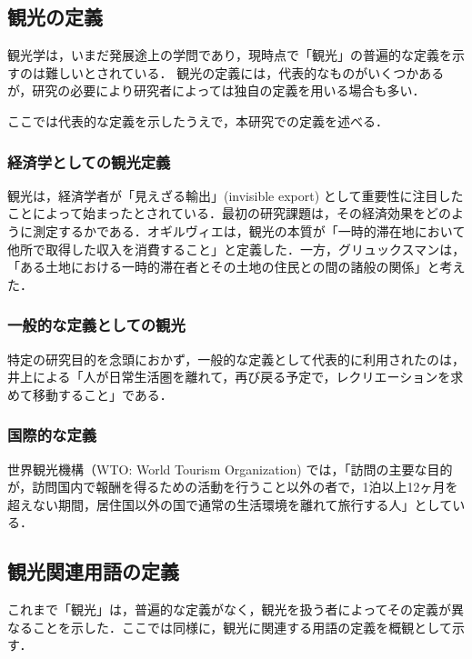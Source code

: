 \documentclass{jsarticle}
\begin{document}
\subsection{観光の定義}

\label{definition_of_tourism}

観光学は，いまだ発展途上の学問であり，現時点で「観光」の普遍的な定義を示すのは難しいとされている\cite{kanko_define}．
観光の定義には，代表的なものがいくつかあるが，研究の必要により研究者によっては独自の定義を用いる場合も多い．

ここでは代表的な定義を示したうえで，本研究での定義を述べる．


\subsubsection{経済学としての観光定義}

観光は，経済学者が「見えざる輸出」(invisible export) として重要性に注目したことによって始まったとされている\cite{kanko_define}．最初の研究課題は，その経済効果をどのように測定するかである．オギルヴィエは，観光の本質が「一時的滞在地において他所で取得した収入を消費すること」と定義した\cite{tourism_economy1}．一方，グリュックスマンは，「ある土地における一時的滞在者とその土地の住民との間の諸般の関係」と考えた\cite{tourism_economy2}．

\subsubsection{一般的な定義としての観光}

特定の研究目的を念頭におかず，一般的な定義として代表的に利用されたのは，井上による「人が日常生活圏を離れて，再び戻る予定で，レクリエーションを求めて移動すること」である\cite{inoue}．

\subsubsection{国際的な定義}

世界観光機構（WTO: World Tourism Organization) では，「訪問の主要な目的が，訪問国内で報酬を得るための活動を行うこと以外の者で，1泊以上12ヶ月を超えない期間，居住国以外の国で通常の生活環境を離れて旅行する人」としている\cite{wto}．

\subsection{観光関連用語の定義}

これまで「観光」は，普遍的な定義がなく，観光を扱う者によってその定義が異なることを示した．ここでは同様に，観光に関連する用語の定義を概観として示す．
\end{document}

